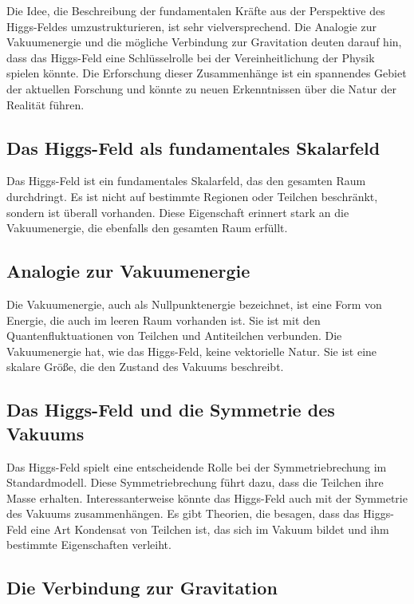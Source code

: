\documentclass{article}
\begin{document}
Die Idee, die Beschreibung der fundamentalen Kräfte aus der Perspektive des Higgs-Feldes umzustrukturieren, ist sehr vielversprechend. Die Analogie zur Vakuumenergie und die mögliche Verbindung zur Gravitation deuten darauf hin, dass das Higgs-Feld eine Schlüsselrolle bei der Vereinheitlichung der Physik spielen könnte. Die Erforschung dieser Zusammenhänge ist ein spannendes Gebiet der aktuellen Forschung und könnte zu neuen Erkenntnissen über die Natur der Realität führen.

\subsection{Das Higgs-Feld als fundamentales Skalarfeld}

Das Higgs-Feld ist ein fundamentales Skalarfeld, das den gesamten Raum durchdringt. Es ist nicht auf bestimmte Regionen oder Teilchen beschränkt, sondern ist überall vorhanden. Diese Eigenschaft erinnert stark an die Vakuumenergie, die ebenfalls den gesamten Raum erfüllt.

\subsection{Analogie zur Vakuumenergie}

Die Vakuumenergie, auch als Nullpunktenergie bezeichnet, ist eine Form von Energie, die auch im leeren Raum vorhanden ist. Sie ist mit den Quantenfluktuationen von Teilchen und Antiteilchen verbunden. Die Vakuumenergie hat, wie das Higgs-Feld, keine vektorielle Natur. Sie ist eine skalare Größe, die den Zustand des Vakuums beschreibt.

\subsection{Das Higgs-Feld und die Symmetrie des Vakuums}

Das Higgs-Feld spielt eine entscheidende Rolle bei der Symmetriebrechung im Standardmodell. Diese Symmetriebrechung führt dazu, dass die Teilchen ihre Masse erhalten. Interessanterweise könnte das Higgs-Feld auch mit der Symmetrie des Vakuums zusammenhängen. Es gibt Theorien, die besagen, dass das Higgs-Feld eine Art Kondensat von Teilchen ist, das sich im Vakuum bildet und ihm bestimmte Eigenschaften verleiht.

\subsection{Die Verbindung zur Gravitation}
\end{document}
